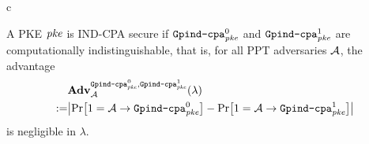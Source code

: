 \begin{security}
\begin{codebox}
\begin{center}
\begin{pchstack}
\begin{pcvstack}
{			\pcreturn c}
		\end{pcvstack}
	\end{pchstack}
\end{center}
\end{codebox}
\vspace{5mm}
 A PKE $\mathit{{pke}}$ is IND-CPA secure if $\text{\texttt{Gpind\text{-}cpa}}^0_{\mathit{{pke}}}$ and $\text{\texttt{Gpind\text{-}cpa}}^1_{\mathit{{pke}}}$ are computationally indistinguishable, that is, for all PPT adversaries $\mathcal{A}$, the advantage
\begin{align*}
&\mathbf{Adv}_{\adv}^{
	\M{Gpind\text{-}cpa}^0_\pke
	,\M{Gpind\text{-}cpa}^1_\pke}
	(\lambda)\\
:=&\abs{\prob{1=\adv\circ \M{Gpind\text{-}cpa}^0_\pke}-\prob{1=\adv\circ \M{Gpind\text{-}cpa}^1_\pke}}
\end{align*}
is negligible in $\lambda$.
\end{security}



